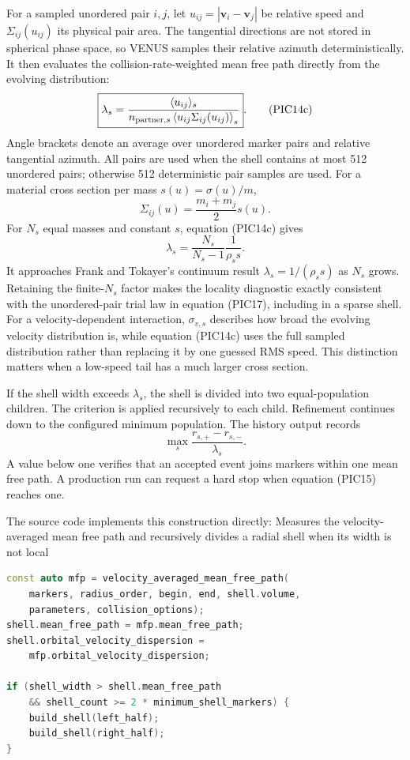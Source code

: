For a sampled unordered pair \(i,j\), let
\(u_{ij}=|\bm v_i-\bm v_j|\) be relative speed and
\(\Sigma_{ij}(u_{ij})\) its physical pair area.  The tangential directions
are not stored in spherical phase space, so VENUS samples their relative
azimuth deterministically.  It then evaluates the collision-rate-weighted
mean free path directly from the evolving distribution:
\[
 \boxed{\displaystyle
 \lambda_s=
 \frac{\langle u_{ij}\rangle_s}
 {n_{{\rm partner},s}\left\langle
 u_{ij}\Sigma_{ij}(u_{ij})\right\rangle_s}}.             \tag{PIC14c}
\]
Angle brackets denote an average over unordered marker pairs and relative
tangential azimuth.  All pairs are used when the shell contains at most 512
unordered pairs; otherwise 512 deterministic pair samples are used.  For a material cross section per
mass \(s(u)=\sigma(u)/m\),
\[
 \Sigma_{ij}(u)=\frac{m_i+m_j}{2}s(u).
\]
For \(N_s\) equal masses and constant \(s\), equation (PIC14c) gives
\[
 \lambda_s=\frac{N_s}{N_s-1}\frac{1}{\rho_s s}.
\]
It approaches Frank and Tokayer's continuum result
\(\lambda_s=1/(\rho_s s)\) as \(N_s\) grows.  Retaining the finite-\(N_s\)
factor makes the locality diagnostic exactly consistent with the
unordered-pair trial law in equation (PIC17), including in a sparse shell.
For a velocity-dependent interaction, \(\sigma_{v,s}\) describes how broad
the evolving velocity distribution is, while equation (PIC14c) uses the full
sampled distribution rather than replacing it by one guessed RMS speed.  This
distinction matters when a low-speed tail has a much larger cross section.

If the shell width exceeds \(\lambda_s\), the shell is divided into two
equal-population children.  The criterion is applied recursively to each child.  Refinement
continues down to the configured minimum population.  The history output
records
\[
 \max_s \frac{r_{s,+}-r_{s,-}}{\lambda_s}.               \tag{PIC15}
\]
A value below one verifies that an accepted event joins markers within one
mean free path.  A production run can request a hard stop when equation
(PIC15) reaches one.

The source code implements this construction directly:
{}
{Measures the velocity-averaged mean free path and recursively divides a
 radial shell when its width is not local}
\begin{lstlisting}[language=C++]
const auto mfp = velocity_averaged_mean_free_path(
    markers, radius_order, begin, end, shell.volume,
    parameters, collision_options);
shell.mean_free_path = mfp.mean_free_path;
shell.orbital_velocity_dispersion =
    mfp.orbital_velocity_dispersion;

if (shell_width > shell.mean_free_path
    && shell_count >= 2 * minimum_shell_markers) {
    build_shell(left_half);
    build_shell(right_half);
}
\end{lstlisting}

